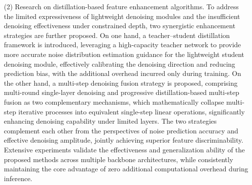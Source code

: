 \begin{englishabstract}
(2) Research on distillation-based feature enhancement algorithms. To address the limited expressiveness of lightweight denoising modules and the insufficient denoising effectiveness under constrained depth, two synergistic enhancement strategies are further proposed. On one hand, a teacher--student distillation framework is introduced, leveraging a high-capacity teacher network to provide more accurate noise distribution estimation guidance for the lightweight student denoising module, effectively calibrating the denoising direction and reducing prediction bias, with the additional overhead incurred only during training. On the other hand, a multi-step denoising fusion strategy is proposed, comprising multi-round single-layer denoising and progressive distillation-based multi-step fusion as two complementary mechanisms, which mathematically collapse multi-step iterative processes into equivalent single-step linear operations, significantly enhancing denoising capability under limited layers. The two strategies complement each other from the perspectives of noise prediction accuracy and effective denoising amplitude, jointly achieving superior feature discriminability. Extensive experiments validate the effectiveness and generalization ability of the proposed methods across multiple backbone architectures, while consistently maintaining the core advantage of zero additional computational overhead during inference.

\par\noindent{}
\end{englishabstract}